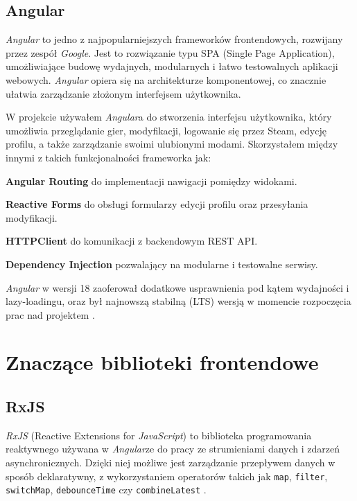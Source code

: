 \documentclass[a4paper,twoside,12pt]{book}
\begin{document}
\subsection{Angular}

\textit{Angular} to jedno z najpopularniejszych frameworków frontendowych, rozwijany przez zespół \textit{Google}. Jest to rozwiązanie typu SPA (Single Page Application), umożliwiające budowę wydajnych, modularnych i łatwo testowalnych aplikacji webowych. \textit{Angular} opiera się na architekturze komponentowej, co znacznie ułatwia zarządzanie złożonym interfejsem użytkownika.

W projekcie używałem \textit{Angular}a do stworzenia interfejsu użytkownika, który umożliwia przeglądanie gier, modyfikacji, logowanie się przez Steam, edycję profilu, a także zarządzanie swoimi ulubionymi modami. Skorzystałem między innymi z takich funkcjonalności frameworka jak:

    \textbf{Angular Routing} do implementacji nawigacji pomiędzy widokami.

    \textbf{Reactive Forms} do obsługi formularzy edycji profilu oraz przesyłania modyfikacji.

    \textbf{HTTPClient} do komunikacji z backendowym REST API.

    \textbf{Dependency Injection} pozwalający na modularne i testowalne serwisy.

\textit{Angular} w wersji 18 zaoferował dodatkowe usprawnienia pod kątem wydajności i lazy-loadingu, oraz był najnowszą stabilną (LTS) wersją w momencie rozpoczęcia prac nad projektem \cite{angular2025}.

\section{Znaczące biblioteki frontendowe}

\subsection{RxJS}

\textit{RxJS} (Reactive Extensions for \textit{JavaScript}) to biblioteka programowania reaktywnego używana w \textit{Angular}ze do pracy ze strumieniami danych i zdarzeń asynchronicznych. Dzięki niej możliwe jest zarządzanie przepływem danych w sposób deklaratywny, z wykorzystaniem operatorów takich jak \texttt{map}, \texttt{filter}, \texttt{switchMap}, \texttt{debounceTime} czy \texttt{combineLatest} \cite{rxjs2025}.
\end{document}

